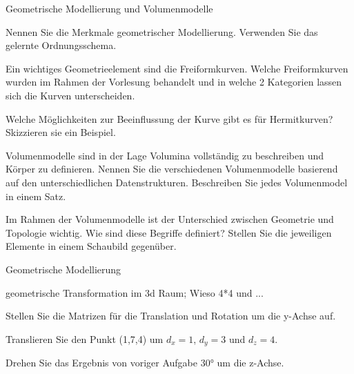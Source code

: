 \documentclass[
	ngerman,
	color = black,
	]{tudaexercise}
\begin{document}
\begin{task}[credit=21 P]{Geometrische Modellierung und Volumenmodelle}
	\begin{subtask}[credit=6 P]
		Nennen Sie die Merkmale geometrischer Modellierung.
		Verwenden Sie das gelernte Ordnungsschema.
	\end{subtask}
	
	\begin{subtask}[credit=2{,}5 P]
		Ein wichtiges Geometrieelement sind die Freiformkurven.
		Welche Freiformkurven wurden im Rahmen der Vorlesung behandelt und in welche 2 Kategorien lassen sich die Kurven unterscheiden.
	\end{subtask}
	
	\begin{subtask}[credit=1{,}5 P]
		Welche Möglichkeiten zur Beeinflussung der Kurve gibt es für Hermitkurven?
		Skizzieren sie ein Beispiel.
	\end{subtask}
	
	\begin{subtask}[credit=6 P]
		Volumenmodelle sind in der Lage Volumina vollständig zu beschreiben und Körper zu definieren.
		Nennen Sie die verschiedenen Volumenmodelle basierend auf den unterschiedlichen Datenstrukturen.
		Beschreiben Sie jedes Volumenmodel in einem Satz.
	\end{subtask}
	
	\begin{subtask}[credit=5 P]
		Im Rahmen der Volumenmodelle ist der Unterschied zwischen Geometrie und Topologie wichtig.
		Wie sind diese Begriffe definiert?
		Stellen Sie die jeweiligen Elemente in einem Schaubild gegenüber.
	\end{subtask}
	
\end{task}

\begin{task}[credit=9 P]{Geometrische Modellierung}
	\begin{subtask}[credit=2 P]
		geometrische Transformation im 3d Raum; Wieso 4*4 und ...
	\end{subtask}
	
	\begin{subtask}[credit=2 P]
		Stellen Sie die Matrizen für die Translation und Rotation um die y-Achse auf.
	\end{subtask}
		
	\begin{subtask}[credit=3 P]
		Translieren Sie den Punkt (1,7,4) um $d_x=1$, $d_y=3$ und $d_z=4$.
	\end{subtask}
	
	\begin{subtask}[credit=2 P]
		Drehen Sie das Ergebnis von voriger Aufgabe 30° um die z-Achse.
	\end{subtask}
\end{task}
\end{document}
